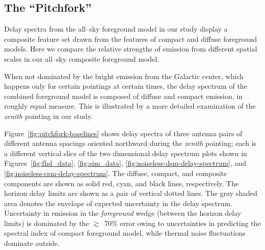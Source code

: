 \documentclass[preprint2,iop,numberedappendix]{emulateapj}
\begin{document}
\subsection{The ``Pitchfork''}\label{sec:composite}

Delay spectra from the all--sky foreground model in our study display a composite feature set drawn from the features of compact and diffuse foreground models. Here we compare the relative strengths of emission from different spatial scales in our all--sky composite foreground model. 

When not dominated by the bright emission from the Galactic center, which happens only for certain pointings at certain times, the delay spectrum of the combined foreground model is composed of diffuse and compact emission, in roughly equal measure. This is illustrated by a more detailed examination of the {\it zenith} pointing in our study. 

Figure~\ref{fig:pitchfork-baselines} shows delay spectra of three antenna pairs of different antenna spacings oriented northward during the {\it zenith} pointing; each is a different vertical slice of the two dimensional delay spectrum plots shown in Figures~\ref{fig:fhd_data}, \ref{fig:sim_data}, \ref{fig:noiseless-dsm-delay-spectrum}, and \ref{fig:noiseless-csm-delay-spectrum}. The diffuse, compact, and composite components are shown as solid red, cyan, and black lines, respectively. The horizon delay limits are shown as a pair of vertical dotted lines. The gray shaded area denotes the envelope of expected uncertainty in the delay spectrum. Uncertainty in emission in the {\it foreground} wedge (between the horizon delay limits) is dominated by the $\gtrsim$~70\% error owing to uncertainties in predicting the spectral index of compact foreground model, while thermal noise fluctuations dominate outside. 
\end{document}
